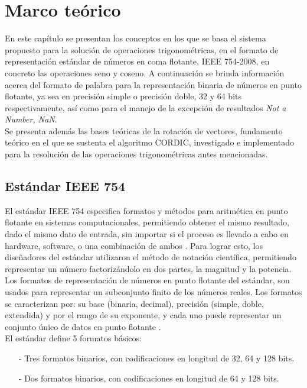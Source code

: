 \chapter{Marco teórico}
\label{ch:marco}

En este capítulo se presentan los conceptos en los que se basa el sistema propuesto para la solución de operaciones trigonométricas, en el formato de representación estándar de números en coma flotante, IEEE 754-2008, en concreto las operaciones seno y coseno. A continuación se brinda información acerca del formato de palabra para la representación binaria de números en punto flotante, ya sea en precisión simple o precisión doble, 32 y 64 bits respectivamente, así como para el manejo de la excepción de resultados \textit{Not a Number, NaN}.\\

Se presenta además las bases teóricas de la rotación de vectores, fundamento teórico en el que se sustenta el algoritmo CORDIC, investigado e implementado para la resolución de las operaciones trigonométricas antes mencionadas.\\


\section{Estándar IEEE 754}

El estándar IEEE 754 especifica formatos y métodos para aritmética en punto flotante en sistemas computacionales, permitiendo obtener el mismo resultado, dado el mismo dato de entrada, sin importar si el proceso es llevado a cabo en hardware, software, o una combinación de ambos \cite{IEEE754}. Para lograr esto, los diseñadores del estándar utilizaron el método de notación científica, permitiendo representar un número factorizándolo en dos partes, la magnitud y la potencia\cite{IEEE754_WEB}.\\

Los formatos de representación de números en punto flotante del estándar, son usados para representar un subconjunto finito de los números reales. Los formatos se caracterizan por: su base (binaria, decimal), precisión (simple, doble, extendida) y por el rango de su exponente, y cada uno puede representar un conjunto único de datos en punto flotante \cite{IEEE754}.\\

El estándar define 5 formatos básicos:\\

\begin{itemize}
	\item[-]	Tres formatos binarios, con codificaciones en longitud de 32, 64 y 128 bits.
	\item[-]	Dos formatos binarios, con codificaciones en longitud de 64 y 128 bits.
\end{itemize}

